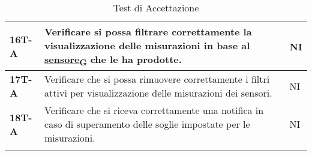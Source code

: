\begin{longtable}{|>{\raggedright\arraybackslash}m{}|>{\raggedright\arraybackslash}m{}|>{\raggedright\arraybackslash}m{}|}
	\hline
	\textbf{16T-A}  & Verificare si possa filtrare correttamente la visualizzazione delle misurazioni in base al \href{https://7last.github.io/docs/rtb/documentazione-interna/glossario\#sensore}{sensore\textsubscript{G}} che le ha prodotte. & NI             \\
	\hline
	\textbf{17T-A}  & Verificare che si possa rimuovere correttamente i filtri attivi per visualizzazione delle misurazioni dei sensori.     & NI             \\
	\hline
	\textbf{18T-A}  & Verificare che si riceva correttamente una notifica in caso di superamento delle soglie impostate per le misurazioni.  & NI             \\
	\hline
	\caption{Test di Accettazione}
\end{longtable}
